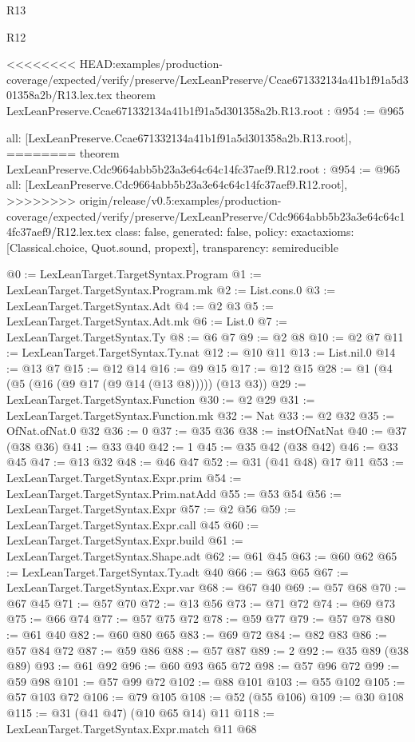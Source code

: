 \begin{lexlean}{R13}
\begin{lexlean}{R12}
\begin{coremodule}
{{{{{{{{}
<<<<<<<< HEAD:examples/production-coverage/expected/verify/preserve/LexLeanPreserve/Ccae671332134a41b1f91a5d301358a2b/R13.lex.tex
theorem LexLeanPreserve.Ccae671332134a41b1f91a5d301358a2b.R13.root : @954 := @965 {
  all: [LexLeanPreserve.Ccae671332134a41b1f91a5d301358a2b.R13.root],
========
theorem LexLeanPreserve.Cdc9664abb5b23a3e64c64c14fc37aef9.R12.root : @954 := @965 {
  all: [LexLeanPreserve.Cdc9664abb5b23a3e64c64c14fc37aef9.R12.root],
>>>>>>>> origin/release/v0.5:examples/production-coverage/expected/verify/preserve/LexLeanPreserve/Cdc9664abb5b23a3e64c64c14fc37aef9/R12.lex.tex
  class: false,
  generated: false,
  policy: exact{axioms: [Classical.choice, Quot.sound, propext]},
  transparency: semireducible
}

@0 := LexLeanTarget.TargetSyntax.Program
@1 := LexLeanTarget.TargetSyntax.Program.mk
@2 := List.cons.{0}
@3 := LexLeanTarget.TargetSyntax.Adt
@4 := @2 @3
@5 := LexLeanTarget.TargetSyntax.Adt.mk
@6 := List.{0}
@7 := LexLeanTarget.TargetSyntax.Ty
@8 := @6 @7
@9 := @2 @8
@10 := @2 @7
@11 := LexLeanTarget.TargetSyntax.Ty.nat
@12 := @10 @11
@13 := List.nil.{0}
@14 := @13 @7
@15 := @12 @14
@16 := @9 @15
@17 := @12 @15
@28 := @1 (@4 (@5 (@16 (@9 @17 (@9 @14 (@13 @8))))) (@13 @3))
@29 := LexLeanTarget.TargetSyntax.Function
@30 := @2 @29
@31 := LexLeanTarget.TargetSyntax.Function.mk
@32 := Nat
@33 := @2 @32
@35 := OfNat.ofNat.{0} @32
@36 := 0
@37 := @35 @36
@38 := instOfNatNat
@40 := @37 (@38 @36)
@41 := @33 @40
@42 := 1
@45 := @35 @42 (@38 @42)
@46 := @33 @45
@47 := @13 @32
@48 := @46 @47
@52 := @31 (@41 @48) @17 @11
@53 := LexLeanTarget.TargetSyntax.Expr.prim
@54 := LexLeanTarget.TargetSyntax.Prim.natAdd
@55 := @53 @54
@56 := LexLeanTarget.TargetSyntax.Expr
@57 := @2 @56
@59 := LexLeanTarget.TargetSyntax.Expr.call @45
@60 := LexLeanTarget.TargetSyntax.Expr.build
@61 := LexLeanTarget.TargetSyntax.Shape.adt
@62 := @61 @45
@63 := @60 @62
@65 := LexLeanTarget.TargetSyntax.Ty.adt @40
@66 := @63 @65
@67 := LexLeanTarget.TargetSyntax.Expr.var
@68 := @67 @40
@69 := @57 @68
@70 := @67 @45
@71 := @57 @70
@72 := @13 @56
@73 := @71 @72
@74 := @69 @73
@75 := @66 @74
@77 := @57 @75 @72
@78 := @59 @77
@79 := @57 @78
@80 := @61 @40
@82 := @60 @80 @65
@83 := @69 @72
@84 := @82 @83
@86 := @57 @84 @72
@87 := @59 @86
@88 := @57 @87
@89 := 2
@92 := @35 @89 (@38 @89)
@93 := @61 @92
@96 := @60 @93 @65 @72
@98 := @57 @96 @72
@99 := @59 @98
@101 := @57 @99 @72
@102 := @88 @101
@103 := @55 @102
@105 := @57 @103 @72
@106 := @79 @105
@108 := @52 (@55 @106)
@109 := @30 @108
@115 := @31 (@41 @47) (@10 @65 @14) @11
@118 := LexLeanTarget.TargetSyntax.Expr.match @11 @68
}}}}}}}}
\end{coremodule}
\end{lexlean}
\end{lexlean}

